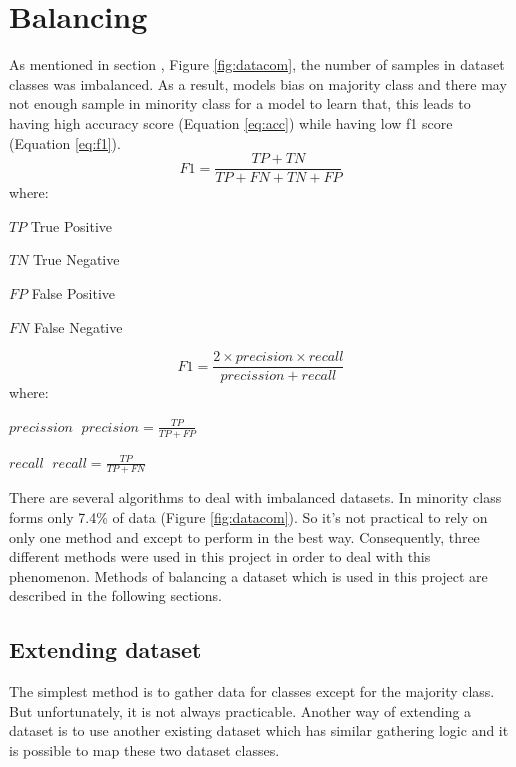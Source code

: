 \section{Balancing}
As mentioned in section , Figure \ref{fig:datacom}, the number of samples in dataset classes was imbalanced. As a result, models bias on majority class and there may not enough sample in minority class for a model to learn that, this leads to having high accuracy score (Equation \ref{eq:acc}) while having low f1 score (Equation \ref{eq:f1}).  
\begin{equation}
\label{eq:acc}
F1 = \frac{TP + TN }{TP + FN + TN + FP}
\end{equation}
where:
\begin{eqexpl}[25mm]
	\item{$TP$} True Positive
	\item{$TN$} True Negative
	\item{$FP$} False Positive 
	\item{$FN$} False Negative
\end{eqexpl}

\begin{equation}
	\label{eq:f1}
	 F1 = \frac{2 \times precision \times recall }{precission + recall}
\end{equation}
where: 
\begin{eqexpl}[25mm]
	\item{$precission$} $\; precision = \frac{TP}{TP + FP} \;$
	\item{$recall$} $\; recall = \frac{TP}{TP + FN} \;$ 
\end{eqexpl}

\bigbreak
There are several algorithms to deal with imbalanced datasets. In \cite{stance_persian} minority class forms only 7.4\% of data (Figure \ref{fig:datacom}). So it's not practical to rely on only one method and except to perform in the best way. Consequently, three different methods were used in this project in order to deal with this phenomenon. Methods of balancing a dataset which is used in this project are described in the following sections.  
	
\subsection{Extending dataset}
The simplest method is to gather data for classes except for the majority class. But unfortunately, it is not always practicable. Another way of extending a dataset is to use another existing dataset which has similar gathering logic and it is possible to map these two dataset classes. 

